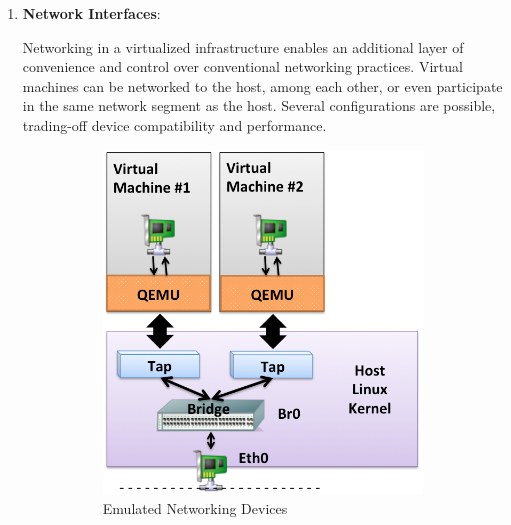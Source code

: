 \begin{enumerate}
\item \textbf{Network Interfaces}:

Networking in a virtualized infrastructure enables an additional layer of convenience and control over conventional networking practices. Virtual machines can be networked to the host, among each other, or even participate in the same network segment as the host. Several configurations are possible, trading-off device compatibility and performance.\begin{figure}
        \centering
        \begin{subfigure}[b]{0.35\textwidth}
                \includegraphics[width=\textwidth]{kvm-emulated.png}
                \caption{Emulated Networking Devices}
                \label{fig:kvm-emulated}
        \end{subfigure}%
        ~ %
        \qquad \hspace{8 mm}
        \begin{subfigure}[b]{0.35\textwidth}

\end{subfigure}
\end{figure}
\end{enumerate}
